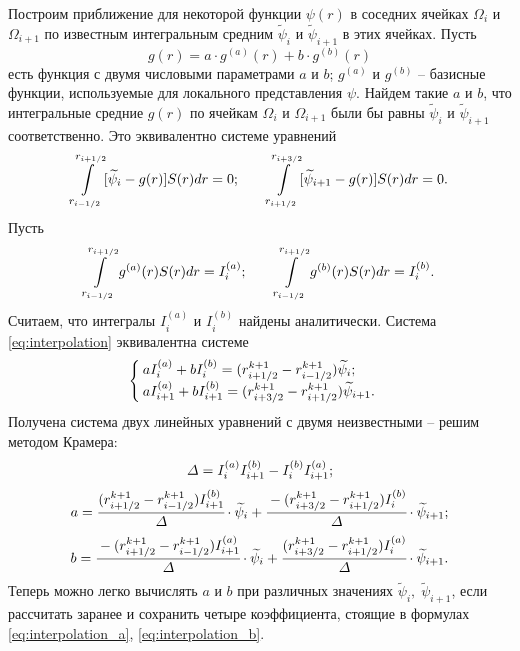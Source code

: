 Построим приближение для некоторой функции $\psi(r)$ в соседних ячейках $\Omega_i$ и $\Omega_{i + 1}$ по известным интегральным средним $\widetilde{\psi}_i$ и $\widetilde{\psi}_{i + 1}$ в этих ячейках. Пусть
$$g(r) = a \cdot g^{(a)}(r) + b \cdot g^{(b)} (r)$$
есть функция с двумя числовыми параметрами $a$ и $b$; $g^{(a)}$ и $g^{(b)}$ -- базисные функции, используемые для локального представления $\psi$. Найдем такие $a$ и $b$, что интегральные средние $g(r)$ по ячейкам $\Omega_i$ и $\Omega_{i + 1}$ были бы равны $\widetilde{\psi}_i$ и $\widetilde{\psi}_{i + 1}$ соответственно. Это эквивалентно системе уравнений
\begin{equation}
    \int\limits_{r_{i - 1/2}}^{r_{i + 1/2}} [\widetilde{\psi}_i - g(r)] S(r) dr = 0 {\text{;}} \qquad \int\limits_{r_{i + 1/2}}^{r_{i + 3/2}} [\widetilde{\psi}_{i + 1} - g(r)] S(r) dr = 0 {\text{.}}
    \label{eq:interpolation}
\end{equation}
Пусть
$$\int\limits_{r_{i - 1/2}}^{r_{i + 1/2}} g^{(a)}(r) S(r) dr = I_i^{(a)}; \qquad \int\limits_{r_{i - 1/2}}^{r_{i + 1/2}} g^{(b)}(r) S(r) dr = I_i^{(b)} {\text{.}}$$
Считаем, что интегралы $I_i^{(a)}$ и $I_i^{(b)}$ найдены аналитически. Система \eqref{eq:interpolation} эквивалентна системе
$$\begin{cases}
    a I_i^{(a)} + b I_i^{(b)} = (r_{i + 1/2}^{k + 1} - r_{i - 1/2}^{k + 1}) \widetilde{\psi}_i {\text{;}} \\
    a I_{i + 1}^{(a)} + b I_{i + 1}^{(b)} = (r_{i + 3/2}^{k + 1} - r_{i + 1/2}^{k + 1}) \widetilde{\psi}_{i + 1} {\text{.}}
\end{cases}$$
Получена система двух линейных уравнений с двумя неизвестными -- решим методом Крамера:
$$\varDelta = I_i^{(a)} I_{i + 1}^{(b)} - I_i^{(b)} I_{i + 1}^{(a)} {\text{;}}$$
\begin{equation}
    a = \cfrac{(r_{i + 1/2}^{k + 1} - r_{i - 1/2}^{k + 1}) I_{i + 1}^{(b)}}{\varDelta} \cdot \widetilde{\psi}_i + \cfrac{-(r_{i + 3/2}^{k + 1} - r_{i + 1/2}^{k + 1}) I_i^{(b)}}{\varDelta} \cdot \widetilde{\psi}_{i + 1} {\text{;}}
    \label{eq:interpolation_a}
\end{equation}
\begin{equation}
    b = \cfrac{-(r_{i + 1/2}^{k + 1} - r_{i - 1/2}^{k + 1}) I_{i + 1}^{(a)}}{\varDelta} \cdot \widetilde{\psi}_i + \cfrac{(r_{i + 3/2}^{k + 1} - r_{i + 1/2}^{k + 1}) I_i^{(a)}}{\varDelta} \cdot \widetilde{\psi}_{i + 1} {\text{.}}
    \label{eq:interpolation_b}
\end{equation}
Теперь можно легко вычислять $a$ и $b$ при различных значениях $\widetilde{\psi}_i, \; \widetilde{\psi}_{i + 1}$, если рассчитать заранее и сохранить четыре коэффициента, стоящие в формулах \eqref{eq:interpolation_a}, \eqref{eq:interpolation_b}. 

